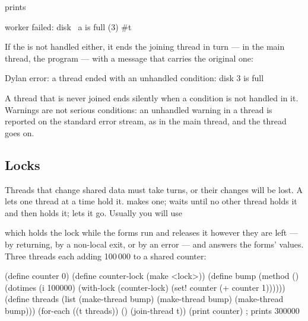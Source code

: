 \noindent prints

\begin{dylan}
worker failed: disk ~a is full (3)
#t
\end{dylan}

If the  is not handled either, it ends the joining
thread in turn --- in the main thread, the program --- with a message
that carries the original one:

\begin{shell}
Dylan error: a thread ended with an unhandled condition: disk 3 is full
\end{shell}

A thread that is never joined ends silently when a condition is not
handled in it. Warnings are not serious conditions: an unhandled warning
in a thread is reported on the standard error stream, as in the main
thread, and the thread goes on.

\subsection{Locks}\label{sec:ext-locks}

Threads that change shared data must take turns, or their changes will
be lost. A  lets one thread at a time hold it.  makes one;  waits until no other
thread holds it and then holds it;  lets
it go. Usually you will use

\begin{quote}
\end{quote}

\noindent which holds the lock while the forms run and releases it
however they are left --- by returning, by a non-local exit, or by an
error --- and answers the forms' values. Three threads each adding
100\,000 to a shared counter:

\begin{dylan}
(define counter 0)
(define counter-lock (make <lock>))
(define bump
  (method ()
    (dotimes (i 100000)
      (with-lock (counter-lock)
        (set! counter (+ counter 1))))))
(define threads (list (make-thread bump) (make-thread bump)
                      (make-thread bump)))
(for-each ((t threads)) () (join-thread t))
(print counter)                                  ; prints 300000
\end{dylan}

